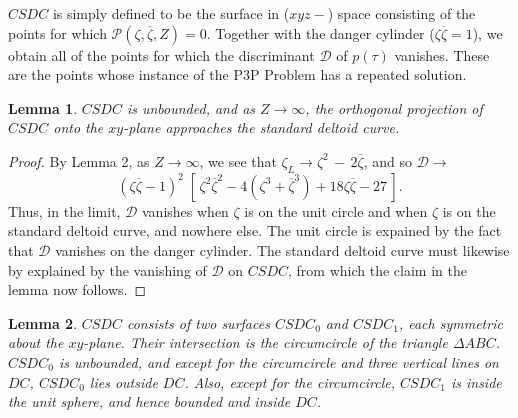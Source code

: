\documentclass[a4paper, twoside]{article}
\newtheorem{lemma}{Lemma}
\begin{document}
\vspace{2mm}

$CSDC$ is simply defined to be the surface in ($xyz-$) space consisting of the points for which $\mathcal{P}(\zeta, \overline{\zeta}, Z) = 0$. Together with the danger cylinder ($\zeta \overline{\zeta} = 1$), we obtain all of the points for which the discriminant $\mathcal{D}$ of $p(\tau)$ vanishes. These are the points whose instance of the P3P Problem has a repeated solution. 

\vspace{2mm}

\begin{lemma}

$CSDC$ is unbounded, and as $Z\rightarrow \infty$, the orthogonal projection of $CSDC$ onto the $xy$-plane approaches the standard deltoid curve.  

\end{lemma}

\begin{proof}

By Lemma 2, as $Z \rightarrow \infty$, we see that $\zeta_L \rightarrow \zeta^2 \, - \, 2 \overline{\zeta}$, and so $\mathcal{D} \rightarrow$ 
$$(\zeta \overline{\zeta} - 1)^2 \; [ \, \zeta^2 \overline{\zeta}^2 - 4 (\zeta^3 + \overline{\zeta}^3) + 18 \zeta \overline{\zeta} - 27 \, ].$$
Thus, in the limit, $\mathcal{D}$ vanishes when $\zeta$ is on the unit circle and when $\zeta$ is on the standard deltoid curve, and nowhere else. The unit circle is expained by the fact that $\mathcal{D}$ vanishes on the danger cylinder. The standard deltoid curve must likewise by explained by the vanishing of $\mathcal{D}$ on $CSDC$, from which the claim in the lemma now follows. 

\end{proof}

\vspace{2mm}

\begin{lemma}

$CSDC$ consists of two surfaces $CSDC_0$ and $CSDC_1$, each symmetric about the $xy$-plane. Their intersection is the circumcircle of the triangle $\Delta ABC$. $CSDC_0$ is unbounded, and except for the circumcircle and three vertical lines on $DC$, $CSDC_0$ lies outside $DC$. Also, except for the circumcircle, $CSDC_1$ is inside the unit sphere, and hence bounded and inside $DC$. \\ 

\end{lemma} 
\end{document}
